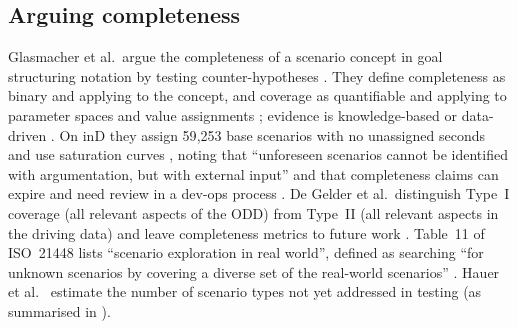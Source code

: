 \documentclass[11pt,a4paper]{article}
\begin{document}
\subsection{Arguing completeness}
Glasmacher et al.\ argue the completeness of a scenario concept in goal structuring notation by testing counter-hypotheses \cite[Sec.~III-C; applied in Sec.~IV-B]{glasmacher2024}. They define completeness as binary and applying to the concept, and coverage as quantifiable and applying to parameter spaces and value assignments \cite[Secs.~III-A, III-B]{glasmacher2024}; evidence is knowledge-based or data-driven \cite[Sec.~III-D, Table~I]{glasmacher2024}. On inD they assign 59{,}253 base scenarios with no unassigned seconds and use saturation curves \cite[Sec.~IV-C, Fig.~5]{glasmacher2024}, noting that ``unforeseen scenarios cannot be identified with argumentation, but with external input'' \cite[Sec.~IV-C]{glasmacher2024} and that completeness claims can expire and need review in a dev-ops process \cite[Sec.~V]{glasmacher2024}. De Gelder et al.\ distinguish Type~I coverage (all relevant aspects of the ODD) from Type~II (all relevant aspects in the driving data) \cite[Sec.~III, Table~III]{degelder2024} and leave completeness metrics to future work \cite[Secs.~V--VI]{degelder2024}. Table~11 of ISO~21448 lists ``scenario exploration in real world'', defined as searching ``for unknown scenarios by covering a diverse set of the real-world scenarios'' \cite[11.3, Table~11, method~O and footnote~e, p.~51]{iso21448}. Hauer et al.\ \cite{hauer2019} estimate the number of scenario types not yet addressed in testing (as summarised in \cite[Sec.~II]{degelder2024}).
\end{document}
